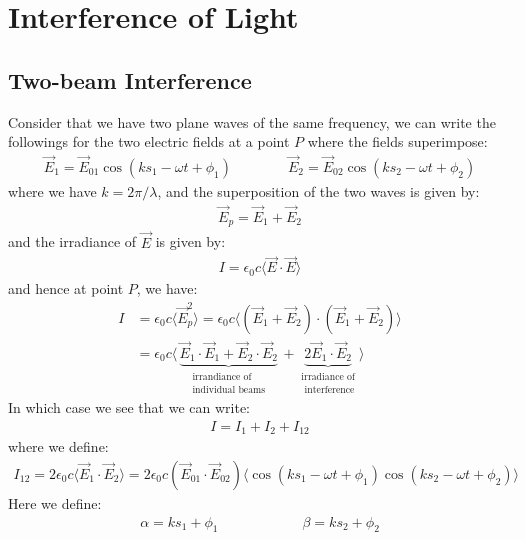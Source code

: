 \documentclass[11pt]{book}
\theoremstyle{break}
\theoremstyle{break}
\begin{document}
\newpage
\chapter{Interference of Light}
\section[Two-beam Interference]{\color{red} Two-beam Interference\color{black}}
Consider that we have two plane waves of the same frequency, we can write the followings for the two electric fields at a point $P$ where the fields superimpose:
\begin{align*}
\vec{E}_1 = \vec{E}_{01} \cos(ks_1 - \omega t + \phi_1) \qquad\qquad\vec{E}_{2} = \vec{E}_{02} \cos(ks_2 - \omega t + \phi_2)
\end{align*}
where we have $k = 2\pi / \lambda$, and the superposition of the two waves is given by:
\begin{align*}
\vec{E}_p  = \vec{E}_1 + \vec{E}_2
\end{align*}
and the irradiance of $\vec{E}$ is given by:
\begin{align*}
I = \epsilon_0 c \langle \vec{E}\cdot \vec{E}\rangle
\end{align*}
and hence at point $P$, we have:
\begin{align*}
I &= \epsilon_0 c \langle \vec{E}_p^2\rangle = \epsilon_0 c\langle(\vec{E}_1 + \vec{E}_2 ) \cdot (\vec{E}_1 + \vec{E}_2 ) \rangle\\
&= \epsilon_0 c \langle \, \underbrace{\vec{E}_1 \cdot \vec{E}_1 + \vec{E}_2 \cdot \vec{E}_2}_{\substack{\text{irrandiance of}\\ \text{individual beams}}} \,+ \underbrace{2\vec{E}_1 \cdot \vec{E}_2}_{\substack{\text{irradiance of} \\\text{ interference}}} \rangle
\end{align*}
In which case we see that we can write:
\begin{align*}
I = I_1 + I_2 + I_{12}
\end{align*}
where we define:
\begin{align*}
I_{12} = 2\epsilon_0 c \langle \vec{E}_1 \cdot \vec{E}_2\rangle =  2\epsilon_0 c  \left(\vec{E}_{01}\cdot \vec{E}_{02}\right) \langle\cos(ks_1 -\omega t + \phi_1)\cos(ks_2 - \omega t +\phi_2)\rangle
\end{align*}
Here we define:
\begin{align*}
\alpha = ks_1 + \phi_1\qquad\qquad\qquad \beta = ks_2 + \phi_2
\end{align*}
\end{document}
